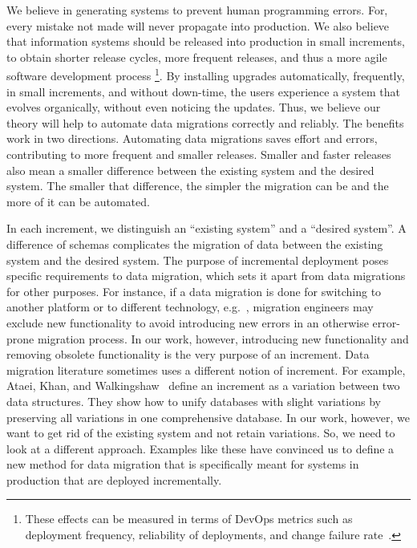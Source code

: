 \documentclass{elsarticle}
\begin{document}
   We believe in generating systems to prevent human programming errors.
   For, every mistake not made will never propagate into production.
   We also believe that information systems should be released into production in small increments,
   to obtain shorter release cycles, more frequent releases, and thus a more agile software development process%
   \footnote{These effects can be measured in terms of DevOps metrics such as
   deployment frequency,
   reliability of deployments, and
   change failure rate~\cite{DevOps2021}.}.
   By installing upgrades automatically, frequently, in small increments, and without down-time,
   the users experience a system that evolves organically, without even noticing the updates.
   Thus, we believe our theory will help to automate data migrations correctly and reliably.
   The benefits work in two directions.
   Automating data migrations saves effort and errors,
   contributing to more frequent and smaller releases.
   Smaller and faster releases also mean a smaller difference between the existing system and the desired system.
   The smaller that difference, the simpler the migration can be and the more of it can be automated.

   In each increment, we distinguish an ``existing system'' and a ``desired system''.
   A difference of schemas complicates the migration of data between the existing system and the desired system.
   The purpose of incremental deployment poses specific requirements to data migration,
   which sets it apart from data migrations for other purposes.
   For instance, if a data migration is done for switching to another platform or to different technology,
   e.g.~\cite{Gholami2016,Bisbal1999},
   migration engineers may exclude new functionality to avoid introducing new errors in an otherwise error-prone migration process.
   In our work, however, introducing new functionality and removing obsolete functionality is the very purpose of an increment.
   Data migration literature sometimes uses a different notion of increment.
   For example, Ataei, Khan, and Walkingshaw~\cite{Ataei2021,Walkingshaw2014} define an increment as a variation between two data structures.
   They show how to unify databases with slight variations by preserving all variations in one comprehensive database.
   In our work, however, we want to get rid of the existing system and not retain variations.
   So, we need to look at a different approach.
   Examples like these have convinced us to define a new method for data migration that is specifically meant for systems in production that are
   deployed incrementally.
   
\end{document}

